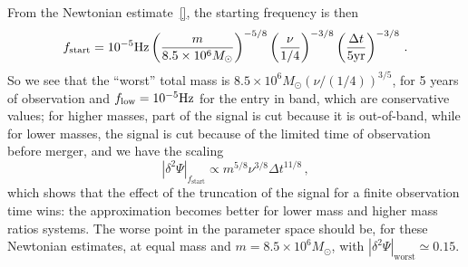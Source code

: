 \documentclass[aps,showpacs,%
prd,superscriptaddress,nofootinbib]{revtex4}
\newcommand{\be}{\begin{equation}}
\newcommand{\ee}{\end{equation}}
\newcommand{\Msol}{M_{\odot}}
\begin{document}
From the Newtonian estimate~\eqref{}, the starting frequency is then
%
\be
	f_{\rm start} = 10^{-5}\mathrm{Hz} \left( \frac{m}{8.5\times10^{6}\Msol} \right)^{-5/8} \left( \frac{\nu}{1/4} \right)^{-3/8} \left( \frac{\Delta t}{5 \mathrm{yr}} \right)^{-3/8} \,.
\ee
%
So we see that the ``worst'' total mass is $8.5\times10^6\Msol (\nu/(1/4))^{3/5}$, for 5 years of observation and $f_{\rm low} = 10^{-5}\mathrm{Hz}$ for the entry in band, which are conservative values; for higher masses, part of the signal is cut because it is out-of-band, while for lower masses, the signal is cut because of the limited time of observation before merger, and we have the scaling
%
\be
	|\delta^{2}\Psi |_{f_\mathrm{start}} \propto m^{5/8}\nu^{3/8}\Delta t^{11/8} \,,
\ee
%
which shows that the effect of the truncation of the signal for a finite observation time wins: the approximation becomes better for lower mass and higher mass ratios systems. The worse point in the parameter space should be, for these Newtonian estimates, at equal mass and $m=8.5\times 10^{6} \Msol$, with $|\delta^{2}\Psi |_{\mathrm{worst}} \simeq 0.15$.
\end{document}
